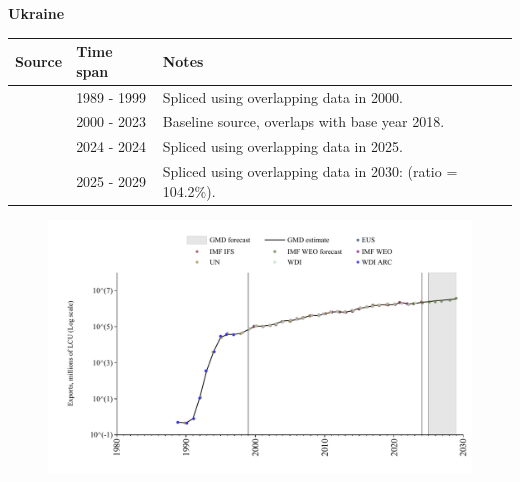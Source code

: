 \documentclass[12pt,a4paper,landscape]{article}
\begin{document}
\begin{adjustbox}{max totalsize={\paperwidth}{\paperheight},center}
\begin{minipage}[t][\textheight][t]{\textwidth}
\vspace*{0.5cm}
{}
\begin{center}
{\Large\bfseries Ukraine}
\end{center}
\vspace{0.5cm}
\begin{table}[H]
\centering
\small
\begin{tabular}{|l|l|l|}
\hline
\textbf{Source} & \textbf{Time span} & \textbf{Notes} \\
\hline
\rowcolor{white}\cite{WDI}& 1989 - 1999 &Spliced using overlapping data in 2000.\\
\rowcolor{lightgray}\cite{EUS}& 2000 - 2023 &Baseline source, overlaps with base year 2018.\\
\rowcolor{white}\cite{IMF_IFS}& 2024 - 2024 &Spliced using overlapping data in 2025.\\
\rowcolor{lightgray}\cite{IMF_WEO_forecast}& 2025 - 2029 &Spliced using overlapping data in 2030: (ratio = 104.2\%).\\
\hline
\end{tabular}
\end{table}
\begin{figure}[H]
\centering
\includegraphics[width=\textwidth,height=0.6\textheight,keepaspectratio]{graphs/UKR_exports.pdf}
\end{figure}
\end{minipage}
\end{adjustbox}
\end{document}
